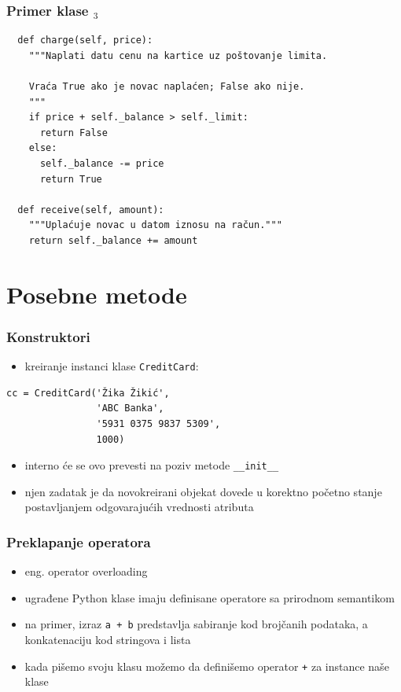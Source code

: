 \documentclass[compress,aspectratio=169]{beamer}
\begin{document}
\begin{frame}[fragile,shrink=10]
  \frametitle{Primer klase $_{3}$}
\begin{verbatim}
  def charge(self, price):
    """Naplati datu cenu na kartice uz poštovanje limita.
    
    Vraća True ako je novac naplaćen; False ako nije.
    """
    if price + self._balance > self._limit:
      return False
    else:
      self._balance -= price
      return True

  def receive(self, amount):
    """Uplaćuje novac u datom iznosu na račun."""
    return self._balance += amount

\end{verbatim}
\end{frame}

\section[Posebne metode]{Posebne metode}
\begin{frame}[fragile]
  \frametitle{Konstruktori}
  \begin{itemize}
    \item kreiranje instanci klase \texttt{CreditCard}: 
  \end{itemize}
\begin{verbatim}
cc = CreditCard('Žika Žikić', 
                'ABC Banka', 
                '5931 0375 9837 5309', 
                1000)
\end{verbatim}
  \begin{itemize}
    \item interno će se ovo prevesti na poziv metode \texttt{\_\_init\_\_}
    \item njen zadatak je da novokreirani objekat dovede u korektno početno stanje postavljanjem odgovarajućih vrednosti atributa
  \end{itemize}
\end{frame}

\begin{frame}[fragile]
  \frametitle{Preklapanje operatora}
  \begin{itemize}
    \item eng. operator overloading
    \item ugrađene Python klase imaju definisane operatore sa prirodnom semantikom
    \item na primer, izraz \texttt{a + b} predstavlja sabiranje kod brojčanih podataka, a konkatenaciju kod stringova i lista
    \item kada pišemo svoju klasu možemo da definišemo operator \texttt{+} za instance naše klase   
  \end{itemize}
\end{frame}
\end{document}
